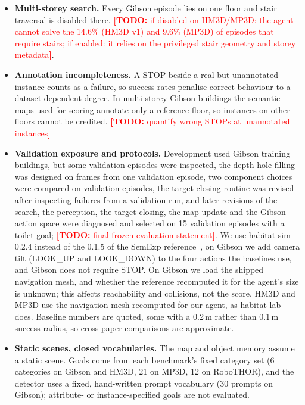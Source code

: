 \documentclass[10pt]{article}
\newcommand{\TODO}[1]{\textcolor{red}{\textbf{[TODO:} #1\textbf{]}}}
\begin{document}
\begin{itemize}[leftmargin=*,itemsep=2pt]
\item \textbf{Multi-storey search.} Every Gibson episode lies on one floor and stair traversal is disabled there.
\TODO{if disabled on HM3D/MP3D: the agent cannot solve the 14.6\% (HM3D v1) and 9.6\% (MP3D) of episodes that
require stairs; if enabled: it relies on the privileged stair geometry and storey metadata}.

\item \textbf{Annotation incompleteness.} A STOP beside a real but unannotated instance counts as a failure, so success
rates penalise correct behaviour to a dataset-dependent degree. In multi-storey Gibson buildings the semantic maps used
for scoring annotate only a reference floor, so instances on other floors cannot be credited.
\TODO{quantify wrong STOPs at unannotated instances}

\item \textbf{Validation exposure and protocols.} Development used Gibson training buildings, but some validation
episodes were inspected, the depth-hole filling was designed on frames from one validation episode, two component
choices were compared on validation episodes, the target-closing routine was revised after inspecting failures
from a validation run, and later revisions of the search, the perception, the target closing, the map update and the Gibson action
space were diagnosed and selected on 15 validation episodes with a toilet goal; \TODO{final frozen-evaluation
statement}. We use habitat-sim~\citep{savva2019habitat} 0.2.4 instead of the 0.1.5 of the SemExp
reference~\citep{chaplot2020object}, on Gibson we add camera tilt (LOOK\_UP and LOOK\_DOWN) to the four actions the
baselines use, and Gibson does not require STOP. On Gibson we load the shipped navigation mesh,
and whether the reference recomputed it for the agent's size is unknown; this affects reachability and collisions,
not the score. HM3D and MP3D use the navigation mesh recomputed for our agent, as habitat-lab does. Baseline numbers are
quoted, some with a 0.2\,m rather than 0.1\,m success radius, so cross-paper comparisons are approximate.

\item \textbf{Static scenes, closed vocabularies.} The map and object memory assume a static scene. Goals come from
each benchmark's fixed category set (6 categories on Gibson and HM3D, 21 on MP3D, 12 on RoboTHOR), and the detector
uses a fixed, hand-written prompt vocabulary (30 prompts on Gibson); attribute- or instance-specified goals are not
evaluated.
\end{itemize}
\end{document}
